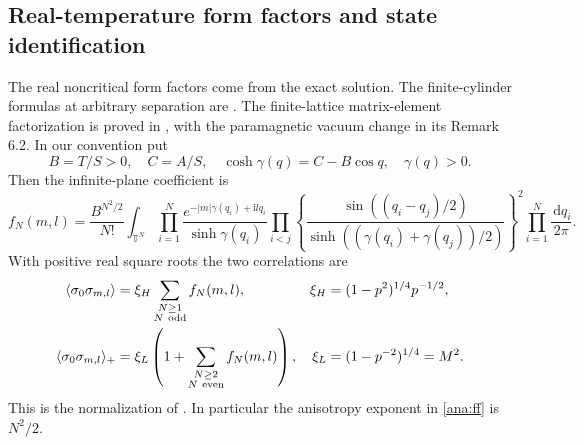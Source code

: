 \documentclass[11pt]{article}
\numberwithin{equation}{section}
\theoremstyle{definition}
\newcommand{\T}{\mathbb T}
\newcommand{\ii}{\mathrm i}
\newcommand{\dd}{\,\mathrm d}
\begin{document}
\subsection{Real-temperature form factors and state identification}
\label{ana:interface}

The real noncritical form factors come from the exact solution.
The finite-cylinder formulas at arbitrary separation are
\cite[(35)--(39)]{BL}. The finite-lattice matrix-element factorization
is proved in \cite[Theorem 6.1]{IL}, with the paramagnetic vacuum
change in its Remark 6.2. In our convention put
\[
 B=T/S>0,\quad C=A/S,\quad
 \cosh\gamma(q)=C-B\cos q,\quad \gamma(q)>0.
\]
Then the infinite-plane coefficient is
\begin{equation}\label{ana:ff}
 f_N(m,l)=\frac{B^{N^2/2}}{N!}
 \int_{\T^N}\prod_{i=1}^N
 \frac{e^{-|m|\gamma(q_i)+\ii lq_i}}{\sinh\gamma(q_i)}
 \prod_{i<j}
 \left\{\frac{\sin((q_i-q_j)/2)}
 {\sinh((\gamma(q_i)+\gamma(q_j))/2)}\right\}^{\!2}
 \prod_{i=1}^N\frac{\dd q_i}{2\pi}.
\end{equation}
With positive real square roots the two correlations are
\begin{align}
 \langle\sigma_0\sigma_{m,l}\rangle
 &=\xi_H\sum_{\substack{N\ge1\\N\ {\rm odd}}}f_N(m,l),
 &\xi_H&=(1-p^2)^{1/4}p^{-1/2},\label{ana:corHT}\\
 \langle\sigma_0\sigma_{m,l}\rangle_+
 &=\xi_L\left(1+\sum_{\substack{N\ge2\\N\ {\rm even}}}f_N(m,l)\right),
 &\xi_L&=(1-p^{-2})^{1/4}=M^2.\label{ana:corLT}
\end{align}
This is the normalization of \cite[(1.8)--(1.10)]{ONGP}.
In particular the anisotropy exponent in \eqref{ana:ff} is \(N^2/2\).
\end{document}
